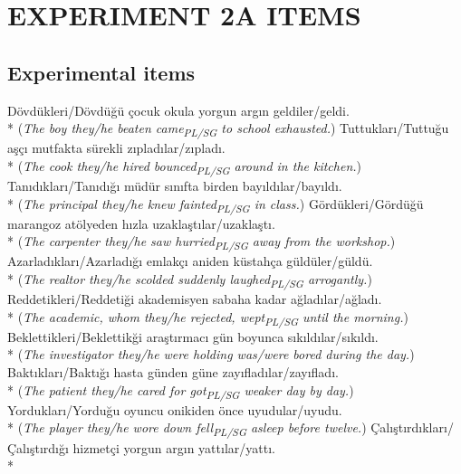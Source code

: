 
\chapter{EXPERIMENT 2A ITEMS} \label{ap:exp2aitems}
\section{Experimental items}

\ea D\"{o}vd\"{u}kleri/D\"{o}vd\"{u}\u{g}\"{u} \c{c}ocuk okula yorgun arg{\i}n geldiler/geldi.\\*
({\it The boy they/he beaten came\textsubscript{PL/SG} to school exhausted.})
\ex Tuttuklar{\i}/Tuttu\u{g}u a\c{s}\c{c}{\i} mutfakta s\"{u}rekli z{\i}plad{\i}lar/z{\i}plad{\i}.\\*
({\it The cook they/he hired bounced\textsubscript{PL/SG} around in the kitchen.})
\ex Tan{\i}d{\i}klar{\i}/Tan{\i}d{\i}\u{g}{\i} m\"{u}d\"{u}r s{\i}n{\i}fta birden bay{\i}ld{\i}lar/bay{\i}ld{\i}.\\*
({\it The principal they/he knew fainted\textsubscript{PL/SG} in class.})
\ex G\"{o}rd\"{u}kleri/G\"{o}rd\"{u}\u{g}\"{u} marangoz at\"{o}lyeden h{\i}zla uzakla\c{s}t{\i}lar/uzakla\c{s}t{\i}.\\*
({\it The carpenter they/he saw hurried\textsubscript{PL/SG} away from the workshop.})
\ex Azarlad{\i}klar{\i}/Azarlad{\i}\u{g}{\i} emlak\c{c}{\i} aniden k\"{u}stah\c{c}a g\"{u}ld\"{u}ler/g\"{u}ld\"{u}.\\*
({\it The realtor they/he scolded suddenly laughed\textsubscript{PL/SG} arrogantly.})
\ex Reddetikleri/Reddeti\u{g}i akademisyen sabaha kadar a\u{g}lad{\i}lar/a\u{g}lad{\i}.\\*
({\it The academic, whom they/he rejected, wept\textsubscript{PL/SG} until the morning.})
\ex Beklettikleri/Beklettik\u{g}i ara\c{s}t{\i}rmac{\i} g\"{u}n boyunca s{\i}k{\i}ld{\i}lar/s{\i}k{\i}ld{\i}.\\*
({\it The investigator they/he were holding was/were bored during the day.})
\ex Bakt{\i}klar{\i}/Bakt{\i}\u{g}{\i} hasta g\"{u}nden g\"{u}ne zay{\i}flad{\i}lar/zay{\i}flad{\i}.\\*
({\it The patient they/he cared for got\textsubscript{PL/SG} weaker day by day.})
\ex Yorduklar{\i}/Yordu\u{g}u oyuncu onikiden \"{o}nce uyudular/uyudu.\\*
({\it The player they/he wore down fell\textsubscript{PL/SG} asleep before twelve.})
\ex \c{C}al{\i}\c{s}t{\i}rd{\i}klar{\i}/\c{C}al{\i}\c{s}t{\i}rd{\i}\u{g}{\i} hizmet\c{c}i yorgun arg{\i}n yatt{\i}lar/yatt{\i}.\\*
